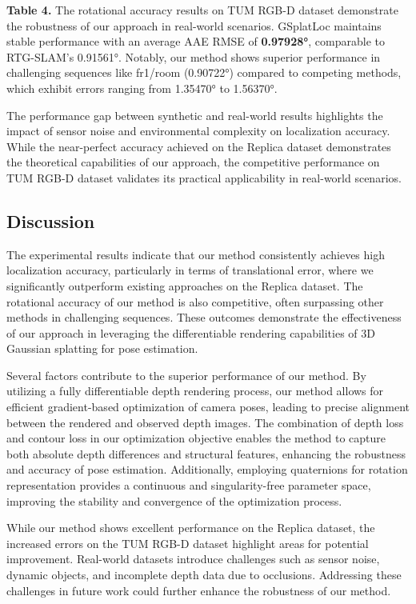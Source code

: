 \documentclass[twocolumn]{article}
\begin{document}
\textbf{Table 4.} The rotational accuracy results on TUM RGB-D
dataset\autocite{sturmBenchmarkEvaluationRGBD2012} demonstrate the
robustness of our approach in real-world scenarios. GSplatLoc maintains
stable performance with an average AAE RMSE of \textbf{0.97928°},
comparable to RTG-SLAM's 0.91561°. Notably, our method shows superior
performance in challenging sequences like fr1/room (0.90722°) compared
to competing methods, which exhibit errors ranging from 1.35470° to
1.56370°.

The performance gap between synthetic and real-world results highlights
the impact of sensor noise and environmental complexity on localization
accuracy. While the near-perfect accuracy achieved on the Replica
dataset demonstrates the theoretical capabilities of our approach, the
competitive performance on TUM RGB-D
dataset\autocite{sturmBenchmarkEvaluationRGBD2012} validates its
practical applicability in real-world scenarios.

\subsection{Discussion}\label{discussion}

The experimental results indicate that our method consistently achieves
high localization accuracy, particularly in terms of translational
error, where we significantly outperform existing approaches on the
Replica dataset. The rotational accuracy of our method is also
competitive, often surpassing other methods in challenging sequences.
These outcomes demonstrate the effectiveness of our approach in
leveraging the differentiable rendering capabilities of 3D Gaussian
splatting for pose estimation.

Several factors contribute to the superior performance of our method. By
utilizing a fully differentiable depth rendering process, our method
allows for efficient gradient-based optimization of camera poses,
leading to precise alignment between the rendered and observed depth
images. The combination of depth loss and contour loss in our
optimization objective enables the method to capture both absolute depth
differences and structural features, enhancing the robustness and
accuracy of pose estimation. Additionally, employing quaternions for
rotation representation provides a continuous and singularity-free
parameter space, improving the stability and convergence of the
optimization process.

While our method shows excellent performance on the Replica dataset, the
increased errors on the TUM RGB-D
dataset\autocite{sturmBenchmarkEvaluationRGBD2012} highlight areas for
potential improvement. Real-world datasets introduce challenges such as
sensor noise, dynamic objects, and incomplete depth data due to
occlusions. Addressing these challenges in future work could further
enhance the robustness of our method.
\end{document}
